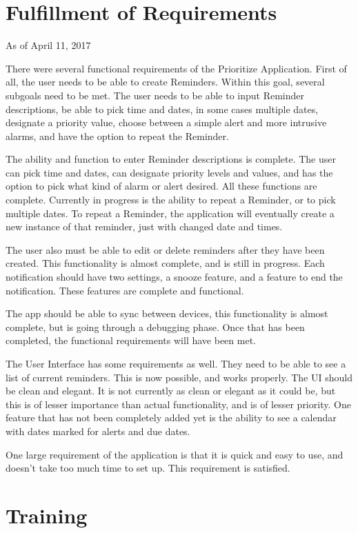 \documentclass[12pt]{article}
\begin{document}
\section{Fulfillment of Requirements}
As of April 11, 2017

There were several functional requirements of the Prioritize Application. First of all, the user needs to be able to create Reminders. Within this goal, several subgoals need to be met. The user needs to be able to input Reminder descriptions, be able to pick time and dates, in some cases multiple dates, designate a priority value, choose between a simple alert and more intrusive alarms, and have the option to repeat the Reminder. 

The ability and function to enter Reminder descriptions is complete. The user can pick time and dates, can designate priority levels and values, and has the option to pick what kind of alarm or alert desired. All these functions are complete. 
Currently in progress is the ability to repeat a Reminder, or to pick multiple dates. To repeat a Reminder, the application will eventually create a new instance of that reminder, just with changed date and times.  

The user also must be able to edit or delete reminders after they have been created. This functionality is almost complete, and is still in progress. 
Each notification should have two settings, a snooze feature, and a feature to end the notification. These features are complete and functional.

The app should be able to sync between devices, this functionality is almost complete, but is going through a debugging phase. Once that has been completed, the functional requirements will have been met.

The User Interface has some requirements as well. They need to be able to see a list of current reminders. This is now possible, and works properly. The UI should be clean and elegant. It is not currently as clean or elegant as it could be, but this is of lesser importance than actual functionality, and is of lesser priority. One feature that has not been completely added yet is the ability to see a calendar with dates marked for alerts and due dates. 

One large requirement of the application is that it is quick and easy to use, and doesn’t take too much time to set up. This requirement is satisfied. 


\section{Training}
\end{document}
